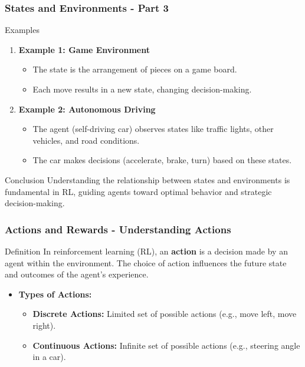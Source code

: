 \documentclass{beamer}
\begin{document}
\begin{frame}[fragile]
    \frametitle{States and Environments - Part 3}
    \begin{block}{Examples}
        \begin{enumerate}
            \item \textbf{Example 1: Game Environment}
            \begin{itemize}
                \item The state is the arrangement of pieces on a game board.
                \item Each move results in a new state, changing decision-making.
            \end{itemize}
            
            \item \textbf{Example 2: Autonomous Driving}
            \begin{itemize}
                \item The agent (self-driving car) observes states like traffic lights, other vehicles, and road conditions.
                \item The car makes decisions (accelerate, brake, turn) based on these states.
            \end{itemize}
        \end{enumerate}
    \end{block}
    
    \begin{block}{Conclusion}
        Understanding the relationship between states and environments is fundamental in RL, guiding agents toward optimal behavior and strategic decision-making.
    \end{block}
\end{frame}

\begin{frame}[fragile]
    \frametitle{Actions and Rewards - Understanding Actions}
    \begin{block}{Definition}
        In reinforcement learning (RL), an \textbf{action} is a decision made by an agent within the environment. The choice of action influences the future state and outcomes of the agent's experience.
    \end{block}
    \begin{itemize}
        \item \textbf{Types of Actions:}
        \begin{itemize}
            \item \textbf{Discrete Actions:} Limited set of possible actions (e.g., move left, move right).
            \item \textbf{Continuous Actions:} Infinite set of possible actions (e.g., steering angle in a car).
        \end{itemize}
    \end{itemize}
\end{frame}
\end{document}
